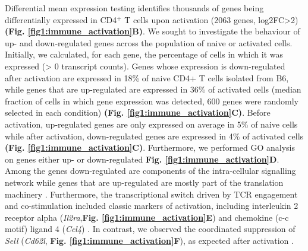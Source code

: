 Differential mean expression testing identifies thousands of genes being differentially expressed in CD4$^+$ T cells upon activation (2063 genes, log2FC>2) \textbf{(Fig. \ref{fig1:immune_activation}B)}. We sought to investigate the behaviour of up- and down-regulated genes across the population of naive or activated cells. Initially, we calculated, for each gene, the percentage of cells in which it was expressed (> 0 transcript counts). Genes whose expression is down-regulated after activation are expressed in 18\% of naive CD4+ T cells isolated from B6, while genes that are up-regulated are expressed in 36\% of activated cells (median fraction of cells in which gene expression was detected, 600 genes were randomly selected in each condition) \textbf{(Fig. \ref{fig1:immune_activation}C)}. Before activation, up-regulated genes are only expressed on average in 5\% of naive cells while after activation, down-regulated genes are expressed in 4\% of activated cells \textbf{(Fig. \ref{fig1:immune_activation}C)}. Furthermore, we performed GO analysis on genes either up- or down-regulated \textbf{Fig. \ref{fig1:immune_activation}D}. Among the genes down-regulated are components of the intra-cellular signalling network while genes that are up-regulated are mostly part of the translation machinery \citep{Bjur2013}. Furthermore, the transcriptional switch driven by TCR engagement and co-stimulation included classic markers of activation, including interleukin 2 receptor alpha (\textit{Il2ra},\textbf{Fig. \ref{fig1:immune_activation}E}) and chemokine (c-c motif) ligand 4 (\textit{Ccl4}) \citep{Asmal2003}. In contrast, we observed the coordinated suppression of \textit{Sell} (\textit{Cd62l}, \textbf{Fig. \ref{fig1:immune_activation}F}), as expected after activation \todo{[REF]}.

